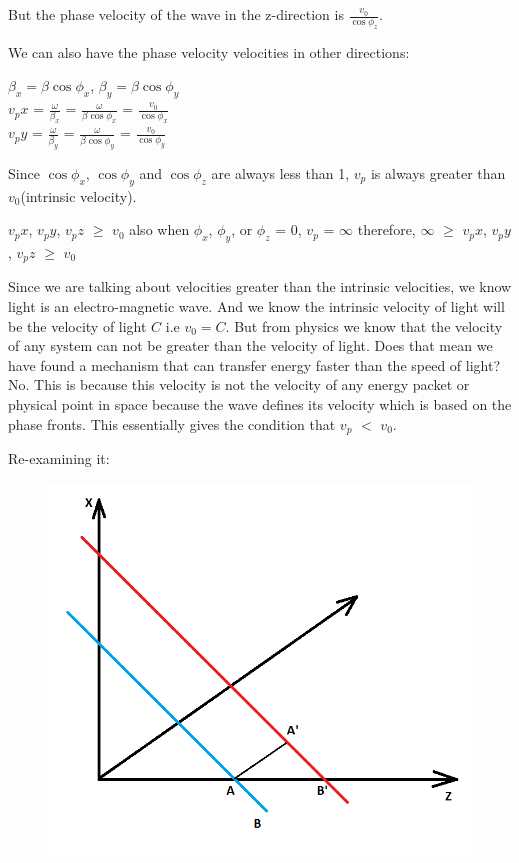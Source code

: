 But the phase velocity of the wave in the z-direction is $\frac{v_0}{\cos\phi_{z}}$.

We can also have the phase velocity velocities in other directions:
\begin{center}
$\beta_x = \beta\cos\phi_{x}$, $\beta_y = \beta\cos\phi_{y}$\\
$v_px$ = $\frac{\omega}{\beta_x}$ = $\frac{\omega}{\beta\cos\phi_{x}}$ = $\frac{v_0}{\cos\phi_{x}}$\\
$v_py$ = $\frac{\omega}{\beta_y}$ = $\frac{\omega}{\beta\cos\phi_{y}}$ = $\frac{v_0}{\cos\phi_{y}}$
\end{center}
Since $\cos\phi_{x}$, $\cos\phi_{y}$ and $\cos\phi_{z}$ are always less than 1, $v_p$ is always greater than $v_0$(intrinsic velocity).
\begin{center}
$v_px$, $v_py$, $v_pz$ $\geq$ $v_0$
also when $\phi_{x}$, $\phi_{y}$, or $\phi_{z}$ = 0, $v_p$ = $\infty$
therefore, $\infty$ $\geq$ $v_px$, $v_py$, $v_pz$ $\geq$ $v_0$
\end{center}
Since we are talking about velocities greater than the intrinsic velocities, we know light is an electro-magnetic wave. And we know the intrinsic velocity of light will be the velocity of light $C$ i.e $v_0 = C$.
But from physics we know that the velocity of any system can not be greater than the velocity of light.
Does that mean we have found a mechanism that can transfer energy faster than the speed of light?
No. This is because this velocity is not the velocity of any energy packet or physical point in space because the wave defines its velocity which is based on the phase fronts. This essentially gives the condition that $v_p$ $<$ $v_0$.

Re-examining it:
\begin{figure}[h]
\centering
\includegraphics[width=.6\linewidth]{./graphics/img2}
\caption{}
\end{figure}

